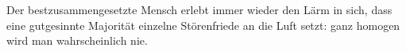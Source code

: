 Der bestzusammengesetzte Mensch erlebt immer wieder den Lärm in sich, dass eine gutgesinnte Majorität einzelne Störenfriede an die Luft setzt: ganz homogen wird man wahrscheinlich nie.
\par

